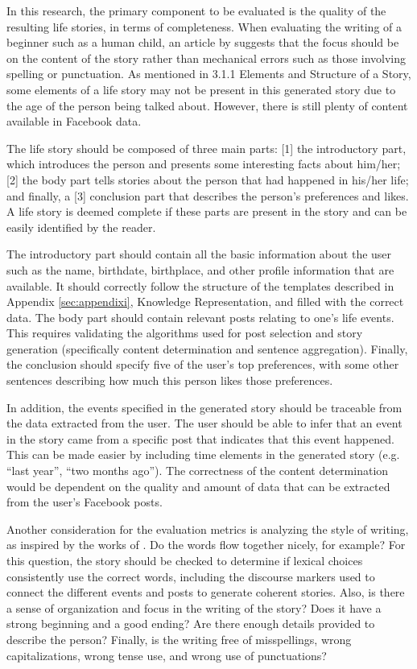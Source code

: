 In this research, the primary component to be evaluated is the quality of the resulting life stories, in terms of completeness. When evaluating the writing of a beginner such as a human child, an article by \cite{Hamilton} suggests that the focus should be on the content of the story rather than mechanical errors such as those involving spelling or punctuation. As mentioned in 3.1.1 Elements and Structure of a Story, some elements of a life story may not be present in this generated story due to the age of the person being talked about. However, there is still plenty of content available in Facebook data.

The life story should be composed of three main parts: [1] the introductory part, which introduces the person and presents some interesting facts about him/her; [2] the body part tells stories about the person that had happened in his/her life; and finally, a [3] conclusion part that describes the person's preferences and likes. A life story is deemed complete if these parts are present in the story and can be easily identified by the reader.

The introductory part should contain all the basic information about the user such as the name, birthdate, birthplace, and other profile information that are available. It should correctly follow the structure of the templates described in Appendix \ref{sec:appendixi}, Knowledge Representation, and filled with the correct data. The body part should contain relevant posts relating to one's life events. This requires validating  the algorithms used for post selection and story generation (specifically content determination and sentence aggregation).  Finally, the conclusion should specify five of the user's top preferences, with some other sentences describing how much this person likes those preferences.

In addition, the events specified in the generated story should be traceable from the data extracted from the user. The user should be able to infer that an event in the story came from a specific post that indicates that this event happened. This can be made easier by including time elements in the generated story (e.g. ``last year'', ``two months ago''). The correctness of the content determination would be dependent on the quality and amount of data that can be extracted from the user's Facebook posts.

Another consideration for the evaluation metrics is analyzing the style of writing, as inspired by the works of \cite{Mcgraw2000}. Do the words flow together nicely, for example? For this question, the story should be checked to determine if lexical choices consistently use the correct words, including the discourse markers used to connect the different events and posts to generate coherent stories. Also, is there a sense of organization and focus in the writing of the story? Does it have a strong beginning and a good ending? Are there enough details provided to describe the person? Finally, is the writing free of misspellings, wrong capitalizations, wrong tense use, and wrong use of punctuations?


